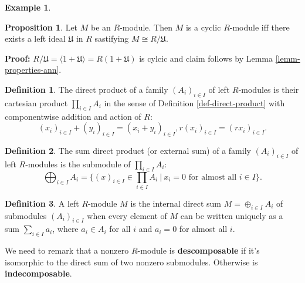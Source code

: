 \documentclass[11pt]{amsbook}%
\theoremstyle{plain}
\theoremstyle{definition}
\newtheorem{definition*}{Definition}
\newtheorem*{example*}{Example}
\newtheorem{proposition}[theorem]{Proposition}
\numberwithin{equation}{section}
\newcommand{\UF}{\mathfrak U}
\renewcommand{\proof}{ \textbf{Proof: }}
\begin{document}
\begin{example*}
\begin{proposition}
  Let $M$ be an $R$-module. Then $M$ is a cyclic $R$-module iff there exists a left ideal $\UF$ in $R$
  sastifying $M \cong R/\UF$.
\end{proposition} \vspace{1.8em}
\proof $R/\UF = \langle 1 + \UF \rangle = R(1 + \UF)$ is cylcic and claim follows by Lemma \ref{lemm-properties-ann}.

\begin{definition*}
  \label{def-direct-product-modules}
  The direct product of a family $(A_{i})_{i \in I}$ of left $R$-modules is their cartesian product $\prod_{i \in I} A_{i}$ in the sense of Definition
  \ref{def-direct-product} with componentwise addition and action of $R$:
  $$
  (x_{i})_{i \in I} + (y_{i})_{i \in I} = (x_{i} + y_{i})_{i \in I}, r(x_{i})_{i \in I} = (rx_{i})_{i \in I}.
  $$
\end{definition*}

\begin{definition*}
  \label{def-direct-sum-modules}
  The sum direct product (or external sum) of a family $(A_{i})_{i \in I}$ of left $R$-modules is the submodule of $\prod_{i \in I} A_{i}$:
  $$
  \bigoplus_{i \in I} A_{i} = \{(x)_{i \in I} \in \prod_{i \in I} A_{i} \ | \ x_{i} = 0 \text{ for almost all } i \in I\}.
  $$
\end{definition*}

\begin{definition*}
  \label{def-internal-sum-modules}
  A left $R$-module $M$ is the internal direct sum $M = \oplus_{i \in I} A_{i}$ of submodules $(A_{i})_{i \in I}$ when
  every element of $M$ can be written uniquely as a sum $\sum_{i \in I} a_{i}$, where $a_{i} \in A_{i}$ for
  all $i$ and $a_{i} = 0$ for almost all $i$.
\end{definition*}
We need to remark that a nonzero $R$-module is \textbf{descomposable} if it's isomorphic to the direct
sum of two nonzero submodules. Otherwise is \textbf{indecomposable}.


\end{example*}
\end{document}
